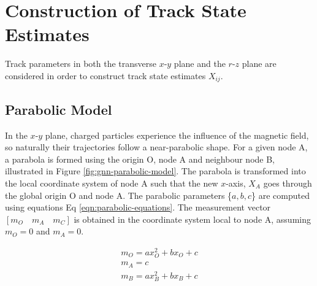 



\section{Construction of Track State Estimates}
\label{constructing-track-states}

Track parameters in both the transverse $x$-$y$ plane and the $r$-$z$ plane are considered in order to construct track state estimates $X_{ij}$.


\subsection{Parabolic Model}
\label{parabolic-state}

In the $x$-$y$ plane, charged particles experience the influence of the magnetic field, so naturally their trajectories follow a near-parabolic shape. For a given node A, a parabola is formed using the origin O, node A and neighbour node B, illustrated in Figure \ref{fig:gnn-parabolic-model}. The parabola is transformed into the local coordinate system of node A such that the new $x$-axis, $X_A$ goes through the global origin O and node A. The parabolic parameters \{$a, b, c$\} are computed using equations Eq \eqref{eqn:parabolic-equations}. The measurement vector $[m_O \quad m_A \quad m_C]$ is obtained in the coordinate system local to node A, assuming $m_O = 0$ and $m_A = 0$.

\begin{equation}
\begin{aligned}
m_O = ax_{O}^{2} + bx_O + c \\
m_A = c \\
m_B = ax_{B}^{2} + bx_B + c
\end{aligned}
\label{eqn:parabolic-equations}
\end{equation}

